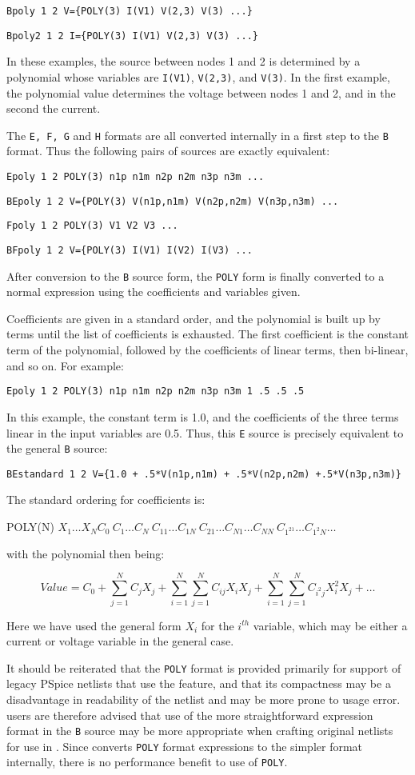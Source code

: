 \verb|Bpoly 1 2 V={POLY(3) I(V1) V(2,3) V(3) ...}|

\verb|Bpoly2 1 2 I={POLY(3) I(V1) V(2,3) V(3) ...}|


In these examples, the source between nodes 1 and 2 is determined by a
polynomial whose variables are \texttt{I(V1)}, \texttt{V(2,3)}, and
\texttt{V(3)}.  In the first example, the polynomial value determines
the voltage between nodes 1 and 2, and in the second the current.

The \texttt{E, F, G} and \texttt{H} formats are all converted internally
in a first step to the \texttt{B} format.  Thus the following pairs of
sources are exactly equivalent:

\verb|Epoly 1 2 POLY(3) n1p n1m n2p n2m n3p n3m ...|

\verb|BEpoly 1 2 V={POLY(3) V(n1p,n1m) V(n2p,n2m) V(n3p,n3m) ...|

\verb|Fpoly 1 2 POLY(3) V1 V2 V3 ...|

\verb|BFpoly 1 2 V={POLY(3) I(V1) I(V2) I(V3) ...|

After conversion to the \texttt{B} source form, the \texttt{POLY} form
is finally converted to a normal expression using the coefficients and
variables given.

Coefficients are given in a standard order, and the polynomial is
built up by terms until the list of coefficients is exhausted.  The
first coefficient is the constant term of the polynomial, followed by
the coefficients of linear terms, then bi-linear, and so on.  For example:

\verb|Epoly 1 2 POLY(3) n1p n1m n2p n2m n3p n3m 1 .5 .5 .5|

In this example, the constant term is 1.0, and the coefficients of the
three terms linear in the input variables are 0.5.  Thus, this
\texttt{E} source is precisely equivalent to the general \texttt{B}
source:

\verb|BEstandard 1 2 V={1.0 + .5*V(n1p,n1m) + .5*V(n2p,n2m) +.5*V(n3p,n3m)}|

The standard ordering for coefficients is:

POLY(N) $X_1 \ldots X_N C_0\ C_1 \ldots C_N\ C_{11} \ldots C_{1N}\ C_{21} \ldots C_{N1} \ldots C_{NN}\ C_{1^21} \ldots  C_{1^2N} \ldots$

with the polynomial then being:

$$Value = C_0 + \sum_{j=1}^{N} C_j X_j + \sum_{i=1}^N\sum_{j=1}^N C_{ij}X_iX_j + \sum_{i=1}^N\sum_{j=1}^N C_{i^2j} X_i^2X_j + \ldots$$

Here we have used the general form $X_i$ for the $i^{th}$ variable,
which may be either a current or voltage variable in the general case.

It should be reiterated that the \texttt{POLY} format is provided
primarily for support of legacy PSpice netlists that use the feature,
and that its compactness may be a disadvantage in readability of the
netlist and may be more prone to usage error.  \Xyce{} users are
therefore advised that use of the more straightforward expression
format in the \texttt{B} source may be more appropriate when crafting
original netlists for use in \Xyce{}.  Since \Xyce{} converts
\texttt{POLY} format expressions to the simpler format internally,
there is no performance benefit to use of \texttt{POLY}.
